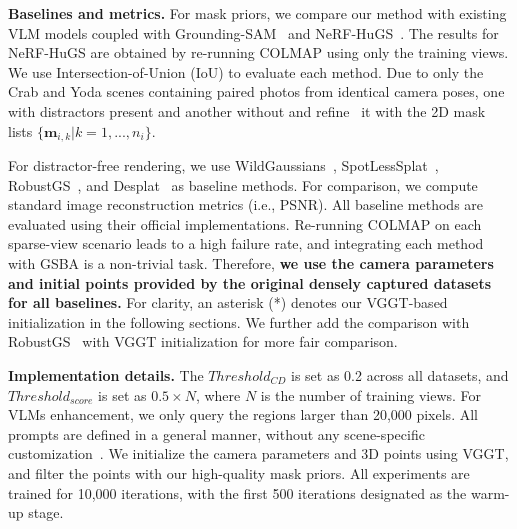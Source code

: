 \documentclass[letterpaper, 10 pt, conference]{ieeeconf}  %
\begin{document}
\noindent
\textbf{Baselines and metrics.} For mask priors, we compare our method with existing VLM models coupled with Grounding-SAM~\cite{ren2024grounded} and NeRF-HuGS~\cite{chen2024nerf}. The results for NeRF-HuGS are obtained by re-running COLMAP using only the training views. We use Intersection-of-Union (IoU) to evaluate each method. Due to only the Crab and Yoda scenes containing paired photos from identical camera poses, one with distractors present and another
without and refine~\cite{ungermann2024robust} it with the 2D mask lists $\{\bm{m}_{i, k} | k = 1, ..., n_i\}$.

For distractor-free rendering, we use WildGaussians~\cite{kulhanek2024wildgaussians}, SpotLessSplat~\cite{sabour2025spotlesssplats}, RobustGS~\cite{ungermann2024robust}, and Desplat~\cite{wang2024desplat} as baseline methods. For comparison, we compute standard image reconstruction metrics (i.e., PSNR). All baseline methods are evaluated using their official implementations. Re-running COLMAP on each sparse-view scenario leads to a high failure rate, and integrating each method with GSBA is a non-trivial task. Therefore, \textbf{we use the camera parameters and initial points provided by the original densely captured datasets for all baselines.} For clarity, an asterisk (*) denotes our VGGT-based initialization in the following sections. We further add the comparison with RobustGS~\cite{ungermann2024robust} with VGGT initialization for more fair comparison.

\noindent
\textbf{Implementation details.} The $Threshold_{CD}$ is set as 0.2 across all datasets, and $Threshold_{score}$ is set as $0.5 \times N$, where $N$ is the number of training views. For VLMs enhancement, we only query the regions larger than 20,000 pixels. All prompts are defined in a general manner, without any scene-specific customization~\cite{li2025sparsegs}. We initialize the camera parameters and 3D points using VGGT, and filter the points with our high-quality mask priors. All experiments are trained for 10,000 iterations, with the first 500 iterations designated as the warm-up stage. 



\end{document}
